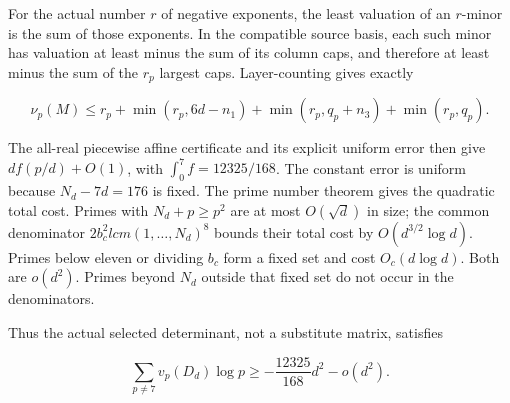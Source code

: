 \documentclass[11pt,a4paper]{article}
\begin{document}
For the actual number \(r\) of negative exponents, the least valuation of an \(r\)-minor is the sum of those exponents. In the compatible source basis, each such minor has valuation at least minus the sum of its column caps, and therefore at least minus the sum of the \(r_p\) largest caps. Layer-counting gives exactly

\[
\nu_p(M)\le r_p+\min(r_p,6d-n_1)+\min(r_p,q_p+n_3)+\min(r_p,q_p).
\]

The all-real piecewise affine certificate and its explicit uniform error then give \(df(p/d)+O(1)\), with \(∫_{0}^{7}f=12325/168\). The constant error is uniform because \(N_d-7d=176\) is fixed. The prime number theorem gives the quadratic total cost. Primes with \(N_d+p≥p^{2}\) are at most \(O(\surd d)\) in size; the common denominator \(2b_c^{2} lcm(1,\ldots ,N_d)^8\) bounds their total cost by \(O(d^{3/2}\operatorname{log} d)\). Primes below eleven or dividing \(b_c\) form a fixed set and cost \(O_c(d \operatorname{log} d)\). Both are \(o(d^{2})\). Primes beyond \(N_d\) outside that fixed set do not occur in the denominators.

Thus the actual selected determinant, not a substitute matrix, satisfies

\[
\sum_{p\ne7}v_p(D_d)\log p
\ge-\frac{12325}{168}d^2-o(d^2).
\]
\end{document}
